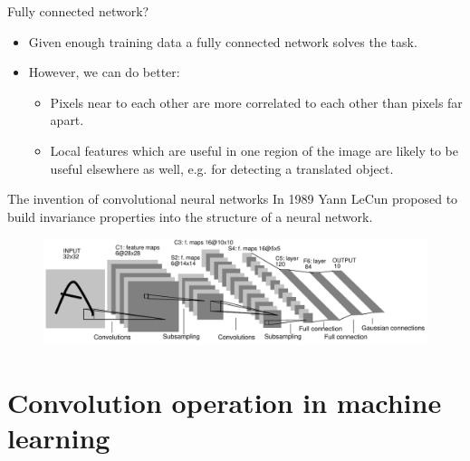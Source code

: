 \documentclass{beamer}
\begin{document}
	\begin{frame}{Fully connected network?}
	\begin{itemize}
		\item Given enough training data a fully connected network solves the task. %
		\item However, we can do better: %
		\begin{itemize}
			\item Pixels near to each other are more correlated to each other than pixels far apart. %
			\item Local features which are useful in one region of the image are likely to be useful elsewhere as well, e.g. for detecting a translated object.
		\end{itemize}
	\end{itemize} 
	\end{frame}

    \begin{frame}{The invention of convolutional neural networks}
        In 1989 Yann LeCun proposed to build invariance properties into the structure of a neural network. 
				\begin{figure}%
				\centering
				\includegraphics[width=1.0\linewidth]{figures/lenet5.pdf}
				\end{figure}   
    \end{frame}
		
    \section{Convolution operation in machine learning}
\end{document}
